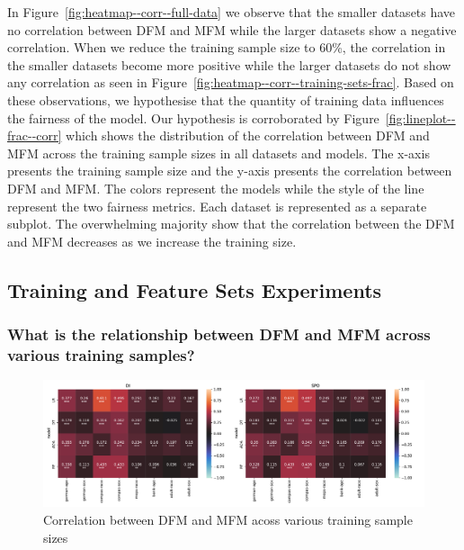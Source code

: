 \documentclass{article}
\begin{document}
In Figure \ref{fig:heatmap--corr--full-data} we observe that the
smaller datasets have no correlation between DFM and MFM while the
larger datasets show a negative correlation. When we reduce the
training sample size to 60\%, the correlation in the smaller datasets
become more positive while the larger datasets do not show any
correlation as seen in
Figure \ref{fig:heatmap--corr--training-sets-frac}. Based on these
observations, we hypothesise that the quantity of training data
influences the fairness of the model. Our hypothesis is corroborated
by Figure \ref{fig:lineplot--frac--corr} which shows the distribution
of the correlation between DFM and MFM across the training sample
sizes in all datasets and models. The x-axis presents the training
sample size and the y-axis presents the correlation between DFM and
MFM. The colors represent the models while the style of the line
represent the two fairness metrics. Each dataset is represented as
a separate subplot. The overwhelming majority show that the
correlation between the DFM and MFM decreases as we increase the
training size.

\subsection{Training and Feature Sets
  Experiments}\label{sec:results-training-feature-sets}

\subsubsection{What is the relationship between DFM and MFM across
  various training samples?}\label{sec:results-training-sets}

\begin{figure}
  \centering
  \includegraphics[width=0.95\linewidth]{heatmap--corr--frac.pdf}
  \caption{Correlation between DFM and MFM acoss various training
    sample sizes}
  \label{fig:heatmap--corr--frac}
\end{figure}
\end{document}
